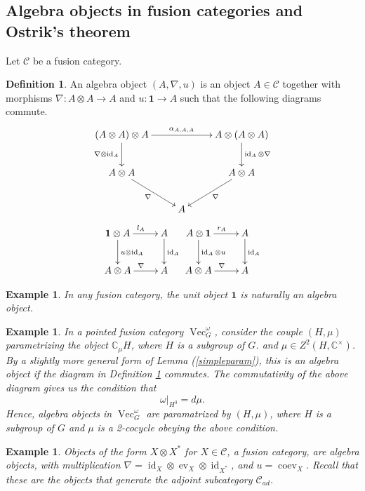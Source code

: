 \documentclass[11pt]{book}
\theoremstyle{Rem}
\newtheorem{Expl}[theorem]{Example}
\theoremstyle{definition}
\newtheorem{Def}[theorem]{Definition}
\numberwithin{equation}{section}
\newcommand\id{\operatorname{id}}
\newcommand\ot{\otimes}
\newcommand\Vect{\operatorname{Vec}}
\newcommand\CC{\mathbb C}
\newcommand\C{\mathcal C}
\newcommand\one{\mathbf{1}}
\newcommand\ev{\operatorname{ev}}
\newcommand\coev{\operatorname{coev}}
\begin{document}
\subsection{Algebra objects in fusion categories and Ostrik's theorem}
Let $\C$ be a fusion category.
\begin{Def}\label{algdef}
 An algebra object $(A, \nabla, u)$ is an object $A\in \C$ together with morphisms $\nabla:A\otimes A \rightarrow A$  and $u: \one\rightarrow A$ such that the following diagrams commute.
\[
\xymatrix{(A \otimes A) \otimes A \ar[d]_{\nabla \otimes \id_A} \ar[rr]^{\alpha_{A, A, A}}& & A\ot (A\ot A)\ar[d]^{\id_A\otimes \nabla}\\
A\otimes A \ar[rd]_{\nabla} & & A\otimes A\ar[ld]^{\nabla}\\
& A & }
\]
\[
\xymatrix{ \one \ot A\ar[d]^{u\ot \id_A} \ar[r]^{l_A} & A\ar[d]^{\id_A} \\
A\ot A \ar[r]^{\nabla} & A
}
\xymatrix{  A\ot \one \ar[d]^{ \id_A\ot u} \ar[r]^{r_A} & A\ar[d]^{\id_A} \\
A\ot A \ar[r]^{\nabla} & A
}
\]
\end{Def}

\begin{Expl}\rm
In any fusion category, the unit object $\one$ is naturally an algebra object.
\end{Expl}

\begin{Expl}\rm
In a pointed fusion category $\Vect^\omega_G$, consider the couple $(H, \mu)$ parametrizing the object $\CC_\mu H$, where $H$ is a subgroup of $G$. and $\mu \in Z^2(H, \CC^\times)$. By a slightly more general form of Lemma (\ref{simpleparam}), this is an algebra object if the diagram in  Definition \ref{algdef} commutes.  The commutativity of the above diagram gives us the condition that \begin{equation}
	\omega|_{H^3} = d\mu.
\end{equation} Hence, algebra objects in $\Vect^\omega_G$ are paramatrized by $(H, \mu)$, where $H$ is a subgroup of $G$ and $\mu$ is a 2-cocycle obeying the above condition.
\end{Expl}
\begin{Expl}\rm\label{canonicalalg}
Objects of the form $X\otimes X^*$ for $X\in \C$, a fusion category, are algebra objects, with multiplication $\nabla = \id_X \otimes \ev_X \otimes \id_{X^*}$, and $u = \coev_X$. Recall that these are the objects that generate the adjoint subcategory $\C_{ad}$.
\end{Expl}
\end{document}
